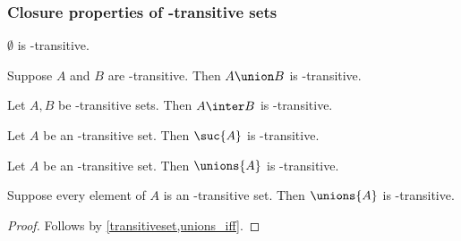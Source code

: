 

\subsubsection{Closure properties of \in-transitive sets}

\begin{proposition}\label{emptyset_transitiveset}
    $\emptyset$ is \in-transitive.
\end{proposition}

\begin{proposition}\label{union_of_transitiveset_is_transitiveset}
    Suppose $A$ and $B$ are \in-transitive.
    Then $A\union B$ is \in-transitive.
\end{proposition}

\begin{proposition}\label{inter_of_transitiveset_is_transitiveset}
    Let $A, B$ be \in-transitive sets.
    Then $A\inter B$ is \in-transitive.
\end{proposition}

\begin{proposition}\label{suc_of_transitiveset_is_transitiveset}
    Let $A$ be an \in-transitive set.
    Then $\suc{A}$ is \in-transitive.
\end{proposition}

\begin{proposition}\label{unions_of_transitiveset_is_transitiveset}
    Let $A$ be an \in-transitive set.
    Then $\unions{A}$ is \in-transitive.
\end{proposition}

\begin{proposition}\label{unions_family_of_transitiveset_is_transitiveset}
    Suppose every element of $A$ is an \in-transitive set.
    Then $\unions{A}$ is \in-transitive.
\end{proposition}
\begin{proof}
    Follows by \cref{transitiveset,unions_iff}.
\end{proof}

